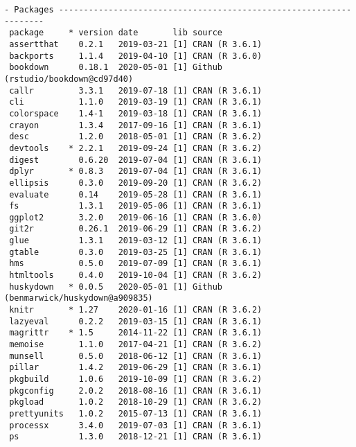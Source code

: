 \documentclass [11pt, proquest] {uwthesis}[2015/03/03]
\begin{document}
\begin{verbatim}
- Packages -------------------------------------------------------------------
 package     * version date       lib source                               
 assertthat    0.2.1   2019-03-21 [1] CRAN (R 3.6.1)                       
 backports     1.1.4   2019-04-10 [1] CRAN (R 3.6.0)                       
 bookdown      0.18.1  2020-05-01 [1] Github (rstudio/bookdown@cd97d40)    
 callr         3.3.1   2019-07-18 [1] CRAN (R 3.6.1)                       
 cli           1.1.0   2019-03-19 [1] CRAN (R 3.6.1)                       
 colorspace    1.4-1   2019-03-18 [1] CRAN (R 3.6.1)                       
 crayon        1.3.4   2017-09-16 [1] CRAN (R 3.6.1)                       
 desc          1.2.0   2018-05-01 [1] CRAN (R 3.6.2)                       
 devtools    * 2.2.1   2019-09-24 [1] CRAN (R 3.6.2)                       
 digest        0.6.20  2019-07-04 [1] CRAN (R 3.6.1)                       
 dplyr       * 0.8.3   2019-07-04 [1] CRAN (R 3.6.1)                       
 ellipsis      0.3.0   2019-09-20 [1] CRAN (R 3.6.2)                       
 evaluate      0.14    2019-05-28 [1] CRAN (R 3.6.1)                       
 fs            1.3.1   2019-05-06 [1] CRAN (R 3.6.1)                       
 ggplot2       3.2.0   2019-06-16 [1] CRAN (R 3.6.0)                       
 git2r         0.26.1  2019-06-29 [1] CRAN (R 3.6.2)                       
 glue          1.3.1   2019-03-12 [1] CRAN (R 3.6.1)                       
 gtable        0.3.0   2019-03-25 [1] CRAN (R 3.6.1)                       
 hms           0.5.0   2019-07-09 [1] CRAN (R 3.6.1)                       
 htmltools     0.4.0   2019-10-04 [1] CRAN (R 3.6.2)                       
 huskydown   * 0.0.5   2020-05-01 [1] Github (benmarwick/huskydown@a909835)
 knitr       * 1.27    2020-01-16 [1] CRAN (R 3.6.2)                       
 lazyeval      0.2.2   2019-03-15 [1] CRAN (R 3.6.1)                       
 magrittr    * 1.5     2014-11-22 [1] CRAN (R 3.6.1)                       
 memoise       1.1.0   2017-04-21 [1] CRAN (R 3.6.2)                       
 munsell       0.5.0   2018-06-12 [1] CRAN (R 3.6.1)                       
 pillar        1.4.2   2019-06-29 [1] CRAN (R 3.6.1)                       
 pkgbuild      1.0.6   2019-10-09 [1] CRAN (R 3.6.2)                       
 pkgconfig     2.0.2   2018-08-16 [1] CRAN (R 3.6.1)                       
 pkgload       1.0.2   2018-10-29 [1] CRAN (R 3.6.2)                       
 prettyunits   1.0.2   2015-07-13 [1] CRAN (R 3.6.1)                       
 processx      3.4.0   2019-07-03 [1] CRAN (R 3.6.1)                       
 ps            1.3.0   2018-12-21 [1] CRAN (R 3.6.1)                       

\end{verbatim}
\end{document}

